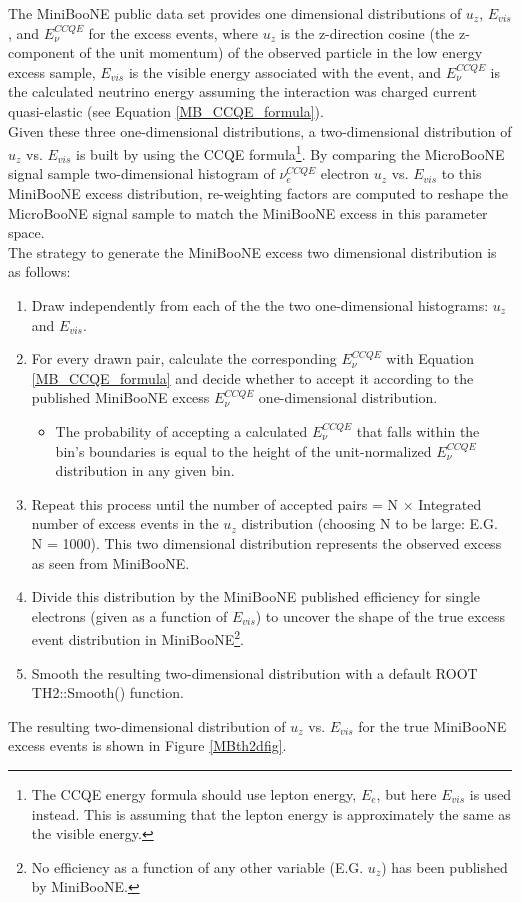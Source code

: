 The MiniBooNE public data set \cite{MB_lee_datarelease} provides one dimensional distributions of $u_z$, $E_{vis}$, and $E_\nu^{CCQE}$ for the excess events, where $u_z$ is the z-direction cosine (the z- component of the unit momentum) of the observed particle in the low energy excess sample, $E_{vis}$ is the visible energy associated with the event, and $E_{\nu}^{CCQE}$ is the calculated neutrino energy assuming the interaction was charged current quasi-elastic (see Equation \ref{MB_CCQE_formula}).\\

Given these three one-dimensional distributions, a two-dimensional distribution of $u_z$ vs. $E_{vis}$ is built by using the CCQE formula\footnote{The CCQE energy formula should use lepton energy, $E_e$, but here $E_{vis}$ is used instead. This is assuming that the lepton energy is approximately the same as the visible energy.}. By comparing the MicroBooNE signal sample two-dimensional histogram of $\nu_e^{CCQE}$ electron $u_z$ vs. $E_{vis}$ to this MiniBooNE excess distribution, re-weighting factors are computed to reshape the MicroBooNE signal sample to match the MiniBooNE excess in this parameter space.\\

The strategy to generate the MiniBooNE excess two dimensional distribution is as follows:
\begin{enumerate}
\item Draw independently from each of the the two one-dimensional histograms: $u_z$ and $E_{vis}$.
\item For every drawn pair, calculate the corresponding $E_\nu^{CCQE}$ with Equation \ref{MB_CCQE_formula} and decide whether to accept it according to the published MiniBooNE excess $E_\nu^{CCQE}$ one-dimensional distribution.
	\begin{itemize}
	\item The probability of accepting a calculated $E_\nu^{CCQE}$ that falls within the bin's boundaries is equal to the height of the unit-normalized $E_\nu^{CCQE}$ distribution in any given bin.
	\end{itemize}
\item Repeat this process until the number of accepted pairs = N $\times$ Integrated number of excess events in the $u_z$ distribution (choosing N to be large: E.G. N = 1000). This two dimensional distribution represents the observed excess as seen from MiniBooNE.
\item Divide this distribution by the MiniBooNE published efficiency for single electrons (given as a function of $E_{vis}$) to uncover the shape of the true excess event distribution in MiniBooNE\footnote{No efficiency as a function of any other variable (E.G. $u_z$) has been published by MiniBooNE.}.
\item Smooth the resulting two-dimensional distribution with a default ROOT TH2::Smooth() function.
\end{enumerate}
The resulting two-dimensional distribution of $u_z$ vs. $E_{vis}$ for the true MiniBooNE excess events is shown in Figure \ref{MBth2dfig}.


